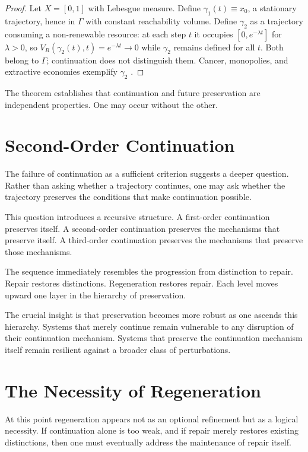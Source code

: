\documentclass[12pt,twoside,openright]{book}
\begin{document}
\begin{proof}
  Let $X=[0,1]$ with Lebesgue measure. Define
  $\gamma_1(t)\equiv x_0$, a stationary trajectory, hence
  in $\Gamma$ with constant reachability volume. Define
  $\gamma_2$ as a trajectory consuming a non-renewable
  resource: at each step $t$ it occupies $[0,e^{-\lambda t}]$
  for $\lambda>0$, so $V_R(\gamma_2(t),t)=e^{-\lambda t}\to0$
  while $\gamma_2$ remains defined for all $t$. Both belong
  to $\Gamma$; continuation does not distinguish them.
  Cancer, monopolies, and extractive economies exemplify
  $\gamma_2$ \parencite{ostrom1990,meadows2008}.
\end{proof}

The theorem establishes that continuation and future
preservation are independent properties. One may occur
without the other.

\section{Second-Order Continuation}
\label{sec:ch10-second-order}

The failure of continuation as a sufficient criterion
suggests a deeper question. Rather than asking whether a
trajectory continues, one may ask whether the trajectory
preserves the conditions that make continuation possible.

This question introduces a recursive structure. A
first-order continuation preserves itself. A second-order
continuation preserves the mechanisms that preserve itself.
A third-order continuation preserves the mechanisms that
preserve those mechanisms.

The sequence immediately resembles the progression from
distinction to repair. Repair restores distinctions.
Regeneration restores repair. Each level moves upward one
layer in the hierarchy of preservation.

The crucial insight is that preservation becomes more
robust as one ascends this hierarchy. Systems that merely
continue remain vulnerable to any disruption of their
continuation mechanism. Systems that preserve the
continuation mechanism itself remain resilient against a
broader class of perturbations.

\section{The Necessity of Regeneration}
\label{sec:ch10-necessity}

At this point regeneration appears not as an optional
refinement but as a logical necessity. If continuation
alone is too weak, and if repair merely restores existing
distinctions, then one must eventually address the
maintenance of repair itself.
\end{document}
